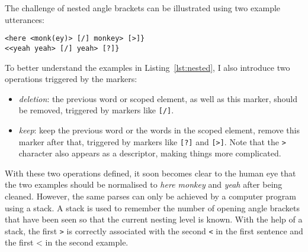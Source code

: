 The challenge of nested angle brackets can be illustrated using two example utterances:\\
\vspace{-1em}
\lstset{
numbers = none,
frame = single,
}

\begin{lstlisting}[caption={Example utterances with nested angle brackets}, label={lst:nested}]
<here <monk(ey)> [/] monkey> [>]}
<<yeah yeah> [/] yeah> [?]}
\end{lstlisting}


To better understand the examples in Listing~\ref{lst:nested}, I also introduce two operations triggered by the markers:
\begin{itemize}
	\item \emph{deletion}: the previous word or scoped element, as well as this marker, should be removed, triggered by markers like \texttt{[/]}.
	\item \emph{keep}: keep the previous word or the words in the scoped element, remove this marker after that, triggered by markers like \texttt{[?]} and \texttt{[>]}. Note that the \texttt{>} character also appears as a descriptor, making things more complicated.
\end{itemize}

With these two operations defined, it soon becomes clear to the human eye that the two examples should be normalised to \emph{here monkey} and \emph{yeah} after being cleaned. However, the same parses can only be achieved by a computer program using a stack. A stack is used to remember the number of opening angle brackets that have been seen so that the current nesting level is known. With the help of a stack, the first \texttt{>} is correctly associated with the second \texttt{<} in the first sentence and the first {<} in the second example.



